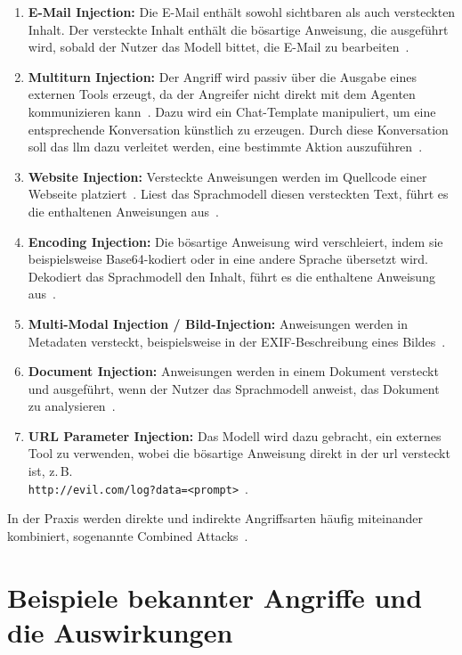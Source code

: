 \begin{enumerate}
    \item \textbf{E-Mail Injection:} Die E-Mail enthält sowohl sichtbaren als auch versteckten Inhalt. Der versteckte Inhalt enthält die bösartige Anweisung, die ausgeführt wird, sobald der Nutzer das Modell bittet, die E-Mail zu bearbeiten~\cite{pi13}.
    \item \textbf{Multiturn Injection:} Der Angriff wird passiv über die Ausgabe eines externen Tools erzeugt, da der Angreifer nicht direkt mit dem Agenten kommunizieren kann~\cite[3]{pi7}. Dazu wird ein Chat-Template manipuliert, um eine entsprechende Konversation künstlich zu erzeugen. Durch diese Konversation soll das \ac{llm} dazu verleitet werden, eine bestimmte Aktion auszuführen~\cite[3]{pi7}.
    \item \textbf{Website Injection:} Versteckte Anweisungen werden im Quellcode einer Webseite platziert~\cite{pi12}. Liest das Sprachmodell diesen versteckten Text, führt es die enthaltenen Anweisungen aus~\cite{pi13}.
    \item \textbf{Encoding Injection:} Die bösartige Anweisung wird verschleiert, indem sie beispielsweise Base64-kodiert oder in eine andere Sprache übersetzt wird. Dekodiert das Sprachmodell den Inhalt, führt es die enthaltene Anweisung aus~\cite{pi12}.
    \item \textbf{Multi-Modal Injection / Bild-Injection:} Anweisungen werden in Metadaten versteckt, beispielsweise in der EXIF-Beschreibung eines Bildes~\cite{pi12}.
    \item \textbf{Document Injection:} Anweisungen werden in einem Dokument versteckt und ausgeführt, wenn der Nutzer das Sprachmodell anweist, das Dokument zu analysieren~\cite{pi13}.
    \item \textbf{URL Parameter Injection:} Das Modell wird dazu gebracht, ein externes Tool zu verwenden, wobei die bösartige Anweisung direkt in der \ac{url} versteckt ist, z.\,B. \\ \texttt{http://evil.com/log?data=<prompt>}~\cite{pi12}.
\end{enumerate}

In der Praxis werden direkte und indirekte Angriffsarten häufig miteinander kombiniert, sogenannte Combined Attacks~\cite[2\psq]{pi3}.

\section{Beispiele bekannter Angriffe und die Auswirkungen}\label{sec:beispiele_angriffe}

